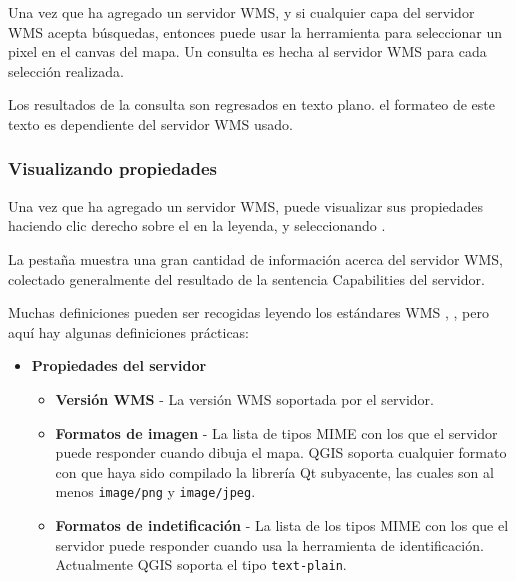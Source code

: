 {Una vez que ha agregado un servidor WMS, y si cualquier capa del servidor WMS  
acepta búsquedas, entonces puede usar la herramienta  para seleccionar un pixel en el canvas del mapa.
Un consulta es hecha al servidor WMS para cada selección realizada.

Los resultados de la consulta  son regresados en texto plano.
el formateo de este texto es dependiente del servidor WMS usado.

\subsubsection{Visualizando propiedades}\label{sec:ogc-wms-properties}

Una vez que ha agregado un servidor WMS, puede visualizar sus propiedades haciendo clic derecho sobre el en la leyenda, y seleccionando .


\label{sec:ogc-wms-properties-metadata}

La pestaña  muestra una gran cantidad de información acerca del servidor WMS, colectado generalmente del resultado de la sentencia Capabilities del servidor.

Muchas definiciones pueden ser recogidas leyendo los estándares WMS
\cite{OGCWMS010101web}, \cite{OGCWMS010300web}, pero aquí hay algunas definiciones prácticas:

\begin{itemize}
\item \textbf{Propiedades del servidor}

\begin{itemize}
\item \textbf{Versión WMS}      - La versión WMS soportada por el servidor.

\item \textbf{Formatos de imagen}    - La lista de tipos MIME con los que el servidor puede responder cuando dibuja el mapa.  QGIS soporta cualquier formato con que haya sido compilado la librería Qt subyacente, las cuales son al menos \texttt{image/png} y \texttt{image/jpeg}.

\item \textbf{Formatos de indetificación} - La lista de los tipos MIME con los que el servidor puede responder cuando usa la herramienta de identificación.  Actualmente QGIS soporta el tipo  \texttt{text-plain}.


\end{itemize}
\end{itemize}}
